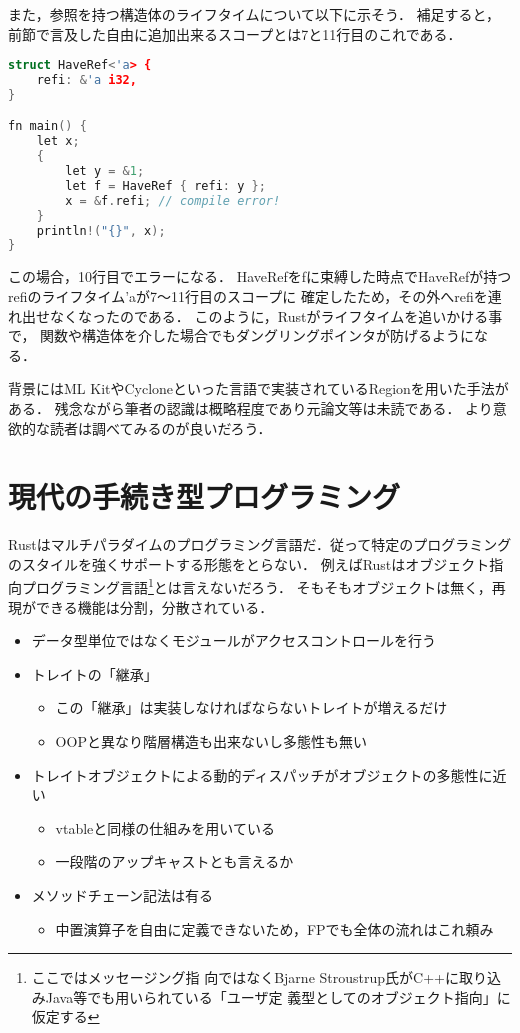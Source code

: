 また，参照を持つ構造体のライフタイムについて以下に示そう．
補足すると，前節で言及した自由に追加出来るスコープ${}$とは7と11行目のこれである．

\begin{lstlisting}[language={C++},caption=構造体のライフタイム,label=lifetime_st]
struct HaveRef<'a> {
    refi: &'a i32,
}

fn main() {
    let x;
    {
        let y = &1;
        let f = HaveRef { refi: y };
        x = &f.refi; // compile error!
    }
    println!("{}", x);
}
\end{lstlisting}

この場合，10行目でエラーになる．
HaveRefをfに束縛した時点でHaveRefが持つrefiのライフタイム'aが7〜11行目のスコープに
確定したため，その外へrefiを連れ出せなくなったのである．
このように，Rustがライフタイムを追いかける事で，
関数や構造体を介した場合でもダングリングポインタが防げるようになる．

背景にはML KitやCycloneといった言語で実装されているRegionを用いた手法がある．
残念ながら筆者の認識は概略程度であり元論文等は未読である．
より意欲的な読者は調べてみるのが良いだろう．

\section{現代の手続き型プログラミング}
Rustはマルチパラダイムのプログラミング言語だ．従って特定のプログラミングのスタイルを強くサポートする形態をとらない．
例えばRustはオブジェクト指向プログラミング言語\footnote{ここではメッセージング指
  向ではなくBjarne Stroustrup氏がC++に取り込みJava等でも用いられている「ユーザ定
  義型としてのオブジェクト指向」に仮定する}とは言えないだろう．
そもそもオブジェクトは無く，再現ができる機能は分割，分散されている．

\begin{itemize}
\item データ型単位ではなくモジュールがアクセスコントロールを行う
\item トレイトの「継承」
  \begin{itemize}
  \item この「継承」は実装しなければならないトレイトが増えるだけ
  \item OOPと異なり階層構造も出来ないし多態性も無い
  \end{itemize}
\item トレイトオブジェクトによる動的ディスパッチがオブジェクトの多態性に近い
  \begin{itemize}
  \item vtableと同様の仕組みを用いている
  \item 一段階のアップキャストとも言えるか
  \end{itemize}
\item メソッドチェーン記法は有る
  \begin{itemize}
  \item 中置演算子を自由に定義できないため，FPでも全体の流れはこれ頼み
  \end{itemize}
\end{itemize}

